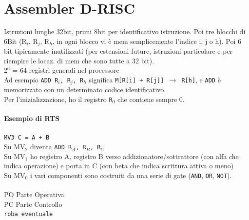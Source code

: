 \documentclass[10pt]{report}
\begin{document}
\section{Assembler D-RISC}
Istruzioni lunghe 32bit, primi 8bit per identificativo istruzione. Poi tre blocchi di 6Bit (R$_{i}$, R$_{j}$, R$_{h}$, in ogni blocco vi è mem semplicemente l'indice i, j o h). Poi 6 bit tipicamente inutilizzati (per estensioni future, istruzioni particolare e per riempire le locaz. di mem che sono tutte a 32 bit).\\
2$^{6}$ = 64 registri generali nel processore\\
Ad esempio \texttt{ADD R$_{i}$, R$_{j}$, R$_{h}$} significa \texttt{M[R[i] + R[j]] $\rightarrow$ R[h]}, e \texttt{ADD} è memorizzato con un determinato codice identificativo.\\
Per l'inizializzazione, ho il registro \texttt{R$_{0}$} che contiene sempre 0.

\paragraph{Esempio di RTS} \texttt{MV3 C = A + B}\\
Su MV$_{2}$ diventa \texttt{ADD R$_{A}$, R$_{B}$, R$_{C}$}\\
Su MV$_{1}$ ho registro A, registro B verso addizionatore/sottrattore (con alfa che indica operazione) e porta in C (con beta che indica scrittura attiva o meno)\\
Su MV$_{0}$ i vari componenti sono costruiti da una serie di gate (\texttt{AND}, \texttt{OR}, \texttt{NOT}).\\
\\
PO Parte Operativa\\
PC Parte Controllo\\
\texttt{roba eventuale}
\end{document}
